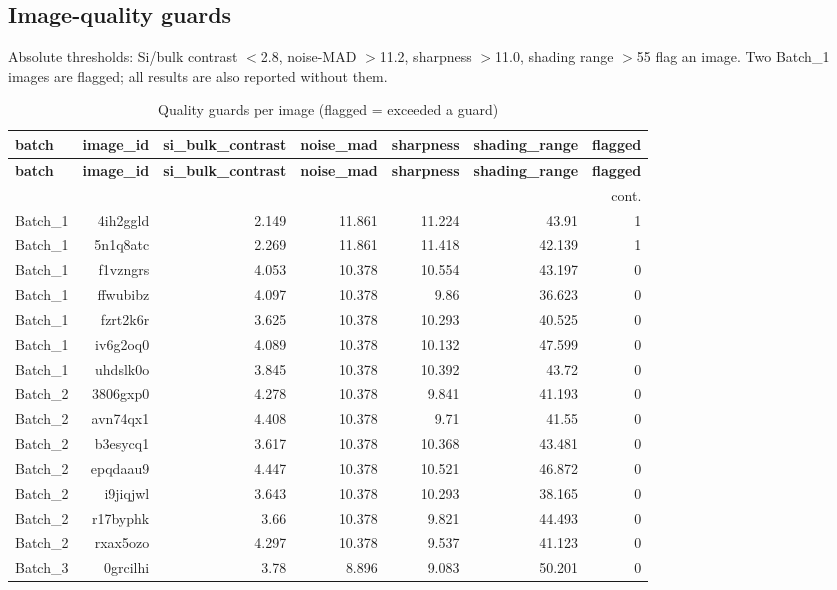 \documentclass[11pt,a4paper]{article}
\begin{document}
\subsection{Image-quality guards}
Absolute thresholds: Si/bulk contrast $<$2.8, noise-MAD $>$11.2, sharpness
$>$11.0, shading range $>$55 flag an image. Two Batch\_1 images are flagged;
all results are also reported without them.
\scriptsize
\begin{longtable}{lrrrrrr}
\caption{Quality guards per image (flagged = exceeded a guard)}\label{tab:guards}\\
\toprule
\textbf{batch} & \textbf{image\_id} & \textbf{si\_bulk\_contrast} & \textbf{noise\_mad} & \textbf{sharpness} & \textbf{shading\_range} & \textbf{flagged} \\
\midrule
\endfirsthead
\toprule \textbf{batch} & \textbf{image\_id} & \textbf{si\_bulk\_contrast} & \textbf{noise\_mad} & \textbf{sharpness} & \textbf{shading\_range} & \textbf{flagged} \\
\midrule
\endhead
\midrule\multicolumn{7}{r}{\footnotesize cont.}\\\midrule\endfoot
\bottomrule\endlastfoot
Batch\_1 & 4ih2ggld & 2.149 & 11.861 & 11.224 & 43.91 & 1 \\
Batch\_1 & 5n1q8atc & 2.269 & 11.861 & 11.418 & 42.139 & 1 \\
Batch\_1 & f1vzngrs & 4.053 & 10.378 & 10.554 & 43.197 & 0 \\
Batch\_1 & ffwubibz & 4.097 & 10.378 & 9.86 & 36.623 & 0 \\
Batch\_1 & fzrt2k6r & 3.625 & 10.378 & 10.293 & 40.525 & 0 \\
Batch\_1 & iv6g2oq0 & 4.089 & 10.378 & 10.132 & 47.599 & 0 \\
Batch\_1 & uhdslk0o & 3.845 & 10.378 & 10.392 & 43.72 & 0 \\
Batch\_2 & 3806gxp0 & 4.278 & 10.378 & 9.841 & 41.193 & 0 \\
Batch\_2 & avn74qx1 & 4.408 & 10.378 & 9.71 & 41.55 & 0 \\
Batch\_2 & b3esycq1 & 3.617 & 10.378 & 10.368 & 43.481 & 0 \\
Batch\_2 & epqdaau9 & 4.447 & 10.378 & 10.521 & 46.872 & 0 \\
Batch\_2 & i9jiqjwl & 3.643 & 10.378 & 10.293 & 38.165 & 0 \\
Batch\_2 & r17byphk & 3.66 & 10.378 & 9.821 & 44.493 & 0 \\
Batch\_2 & rxax5ozo & 4.297 & 10.378 & 9.537 & 41.123 & 0 \\
Batch\_3 & 0grcilhi & 3.78 & 8.896 & 9.083 & 50.201 & 0 \\

\end{longtable}
\end{document}
